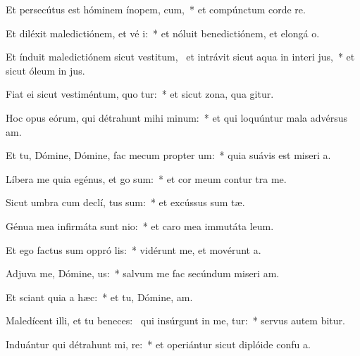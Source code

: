 \item Et persecútus est hóminem ínopem,  cum,~* et compúnctum corde re.
\item Et diléxit maledictiónem, et vé i:~* et nóluit benedictiónem, et elongá  o.
\item Et índuit maledictiónem sicut vestitum,~\pscross{} et intrávit sicut aqua in interi jus,~* et sicut óleum in  jus.
\item Fiat ei sicut vestiméntum, quo tur:~* et sicut zona, qua  gitur.
\item Hoc opus eórum, qui détrahunt mihi  minum:~* et qui loquúntur mala advérsus  am.
\item Et tu, Dómine, Dómine, fac mecum propter  um:~* quia suávis est miseri a.
\item Líbera me quia egénus, et  go sum:~* et cor meum contur  tra me.
\item Sicut umbra cum declí, tus sum:~* et excússus sum  tæ.
\item Génua mea infirmáta sunt  nio:~* et caro mea immutáta   leum.
\item Et ego factus sum oppró lis:~* vidérunt me, et movérunt  a.
\item Adjuva me, Dómine,  us:~* salvum me fac secúndum miseri am.
\item Et sciant quia  a hæc:~* et tu, Dómine,  am.
\item Maledícent illi, et tu beneces:~\pscross{} qui insúrgunt in me, tur:~* servus autem  bitur.
\item Induántur qui détrahunt mi, re:~* et operiántur sicut diplóide confu a.
